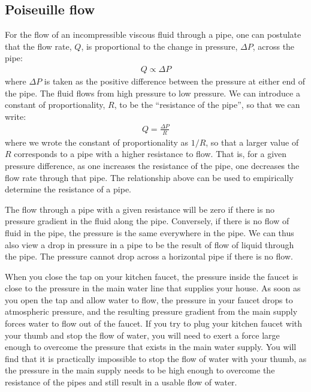 {{\subsection{Poiseuille flow}
\label{sec:fluidmechanics:poiseuille}
For the flow of an incompressible viscous fluid through a pipe, one can postulate that the flow rate, $Q$, is proportional to the change in pressure, $\Delta P$, across the pipe:
\begin{align*}
Q \propto \Delta P
\end{align*}
where $\Delta P$ is taken as the positive difference between the pressure at either end of the pipe. The fluid flows from high pressure to low pressure. We can introduce a constant of proportionality, $R$, to be the ``resistance of the pipe'', so that we can write:
\begin{align*}
Q = \frac{\Delta P}{R} 
\end{align*}
where we wrote the constant of proportionality as $1/R$, so that a larger value of $R$ corresponds to a pipe with a higher resistance to flow. That is, for a given pressure difference, as one increases the resistance of the pipe, one decreases the flow rate through that pipe. The relationship above can be used to empirically determine the resistance of a pipe.

The flow through a pipe with a given resistance will be zero if there is no pressure gradient in the fluid along the pipe. Conversely, if there is no flow of fluid in the pipe, the pressure is the same everywhere in the pipe. We can thus also view a drop in pressure in a pipe to be the result of flow of liquid through the pipe. The pressure cannot drop across a horizontal pipe if there is no flow.

When you close the tap on your kitchen faucet, the pressure inside the faucet is close to the pressure in the main water line that supplies your house. As soon as you open the tap and allow water to flow, the pressure in your faucet drops to atmospheric pressure, and the resulting pressure gradient from the main supply forces water to flow out of the faucet. If you try to plug your kitchen faucet with your thumb and stop the flow of water, you will need to exert a force large enough to overcome the pressure that exists in the main water supply. You will find that it is practically impossible to stop the flow of water with your thumb, as the pressure in the main supply needs to be high enough to overcome the resistance of the pipes and still result in a usable flow of water. 

}}
